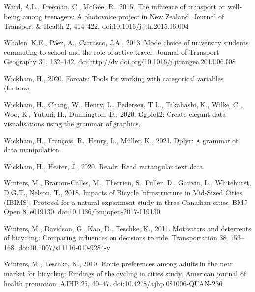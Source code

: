 \documentclass[]{elsarticle} %
\begin{document}
\leavevmode\hypertarget{ref-wardInfluenceTransportWellbeing2015}{}%
Ward, A.L., Freeman, C., McGee, R., 2015. The influence of transport on
well-being among teenagers: A photovoice project in New Zealand. Journal
of Transport \& Health 2, 414--422.
doi:\href{https://doi.org/10.1016/j.jth.2015.06.004}{10.1016/j.jth.2015.06.004}

\leavevmode\hypertarget{ref-whalenModeChoice2013}{}%
Whalen, K.E., Páez, A., Carrasco, J.A., 2013. Mode choice of university
students commuting to school and the role of active travel. Journal of
Transport Geography 31, 132--142.
doi:\href{https://doi.org/http://dx.doi.org/10.1016/j.jtrangeo.2013.06.008}{http://dx.doi.org/10.1016/j.jtrangeo.2013.06.008}

\leavevmode\hypertarget{ref-R-forcats}{}%
Wickham, H., 2020. Forcats: Tools for working with categorical variables
(factors).

\leavevmode\hypertarget{ref-R-ggplot2}{}%
Wickham, H., Chang, W., Henry, L., Pedersen, T.L., Takahashi, K., Wilke,
C., Woo, K., Yutani, H., Dunnington, D., 2020. Ggplot2: Create elegant
data visualisations using the grammar of graphics.

\leavevmode\hypertarget{ref-R-dplyr}{}%
Wickham, H., François, R., Henry, L., Müller, K., 2021. Dplyr: A grammar
of data manipulation.

\leavevmode\hypertarget{ref-R-readr}{}%
Wickham, H., Hester, J., 2020. Readr: Read rectangular text data.

\leavevmode\hypertarget{ref-wintersImpactsBicycleInfrastructure2018}{}%
Winters, M., Branion-Calles, M., Therrien, S., Fuller, D., Gauvin, L.,
Whitehurst, D.G.T., Nelson, T., 2018. Impacts of Bicycle Infrastructure
in Mid-Sized Cities (IBIMS): Protocol for a natural experiment study in
three Canadian cities. BMJ Open 8, e019130.
doi:\href{https://doi.org/10.1136/bmjopen-2017-019130}{10.1136/bmjopen-2017-019130}

\leavevmode\hypertarget{ref-wintersMotivatorsDeterrentsBicycling2011}{}%
Winters, M., Davidson, G., Kao, D., Teschke, K., 2011. Motivators and
deterrents of bicycling: Comparing influences on decisions to ride.
Transportation 38, 153--168.
doi:\href{https://doi.org/10.1007/s11116-010-9284-y}{10.1007/s11116-010-9284-y}

\leavevmode\hypertarget{ref-wintersRoutePreferencesAdults2010}{}%
Winters, M., Teschke, K., 2010. Route preferences among adults in the
near market for bicycling: Findings of the cycling in cities study.
American journal of health promotion: AJHP 25, 40--47.
doi:\href{https://doi.org/10.4278/ajhp.081006-QUAN-236}{10.4278/ajhp.081006-QUAN-236}
\end{document}
